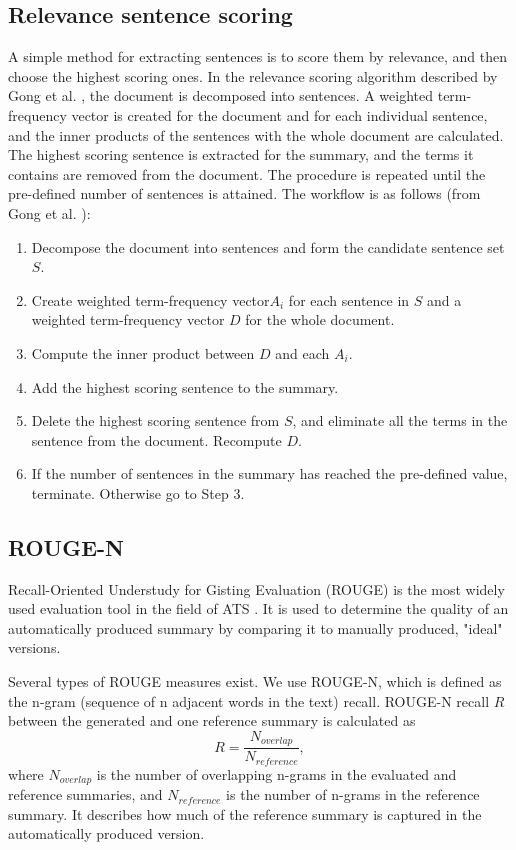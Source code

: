 \documentclass[conference]{IEEEtran}
\begin{document}
\subsection{Relevance sentence scoring}
A simple method for extracting sentences is to score them by relevance, and then choose the highest scoring ones. In the relevance scoring algorithm described by Gong et al. \cite{gong2001}, the document is decomposed into sentences. A weighted term-frequency vector is created for the document and for each individual sentence, and the inner products of the sentences with the whole document are calculated. The highest scoring sentence is extracted for the summary, and the terms it contains are removed from the document. The procedure is repeated until the pre-defined number of sentences is attained. The workflow is as follows (from Gong et al. \cite{gong2001}):
\begin{enumerate}
	\item Decompose the document into sentences and form the candidate sentence set $S$.
	\item Create weighted term-frequency vector$A_i$  for each sentence in $S$ and a weighted term-frequency vector $D$ for the whole document.
	\item Compute the inner product between $D$ and each $A_i$.
	\item Add the highest scoring sentence to the summary.
	\item Delete the highest scoring sentence from $S$, and eliminate all the terms in the sentence from the document. Recompute $D$.
	\item If the number of sentences in the summary has reached the pre-defined value, terminate. Otherwise go to Step 3.
\end{enumerate}


\subsection{ROUGE-N}
Recall-Oriented Understudy for Gisting Evaluation (ROUGE) \cite{lin2004} is the most widely used evaluation tool in the field of ATS \cite{el-kassas2020}. It is used to determine the quality of an automatically produced summary by comparing it to manually produced, "ideal" versions. 

Several types of ROUGE measures exist. We use ROUGE-N, which is defined as the n-gram (sequence of n adjacent words in the text) recall. ROUGE-N recall $R$ between the generated and one reference summary is calculated as
\begin{equation}
R = \frac{N_{overlap}}{N_{reference}},
\end{equation}
where $N_{overlap}$ is the number of overlapping n-grams in the evaluated and reference summaries, and $N_{reference}$ is the number of n-grams in the reference summary. It describes how much of the reference summary is captured in the automatically produced version.
\end{document}
